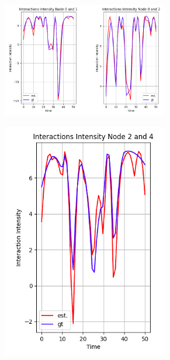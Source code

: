 \begin{figure}[H]
    \centering
    \begin{subfigure}[b]{0.9\textwidth}
        \centering
        \includegraphics[width=0.8\textwidth]{0_images/rq1_10step_SCVM_intensity1.png}
    \end{subfigure}
    \vfill
    \begin{subfigure}[b]{0.45\textwidth}
        \centering
        \includegraphics[width=0.8\textwidth]{0_images/rq1_10step_SCVM_intensity3.png}
    \end{subfigure}

\end{figure}
